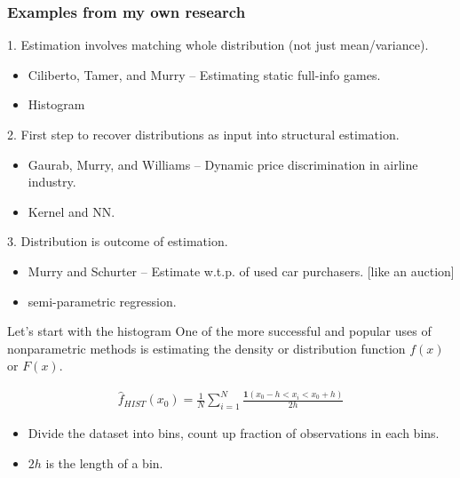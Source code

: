 \begin{frame}[c]\frametitle{Examples from my own research}
    

1. Estimation involves matching whole distribution (not just mean/variance).\\[-.25em]
\begin{itemize}
  \item Ciliberto, Tamer, and Murry -- Estimating static full-info games. 
  \item Histogram
\end{itemize}

2. First step to recover distributions as input into structural estimation.\\[-.25em]
\begin{itemize}
  \item Gaurab, Murry, and Williams -- Dynamic price discrimination in airline industry. 
  \item Kernel and NN.
\end{itemize}


3. Distribution is outcome of estimation.\\[-.25em]
\begin{itemize}
  \item Murry and Schurter -- Estimate w.t.p. of used car purchasers. [like an auction]
  \item semi-parametric regression.
\end{itemize}


\end{frame}




\begin{frame}{Let's start with the histogram}
  One of the more successful and popular uses of nonparametric methods is estimating the density or distribution function $f(x)$ or $F(x)$.
  
  \begin{eqnarray*}
    \hat{f}_{HIST}(x_0) = \frac{1}{N} \sum_{i=1}^N \frac{\mathbf{1}(x_0 - h < x_i < x_0 + h)}{2 h}
  \end{eqnarray*}
    
  \begin{itemize}
  \item Divide the dataset into bins, count up fraction of observations in each bins.
  \item $2h$ is the length of a bin. 
  \end{itemize}
\end{frame}
 


